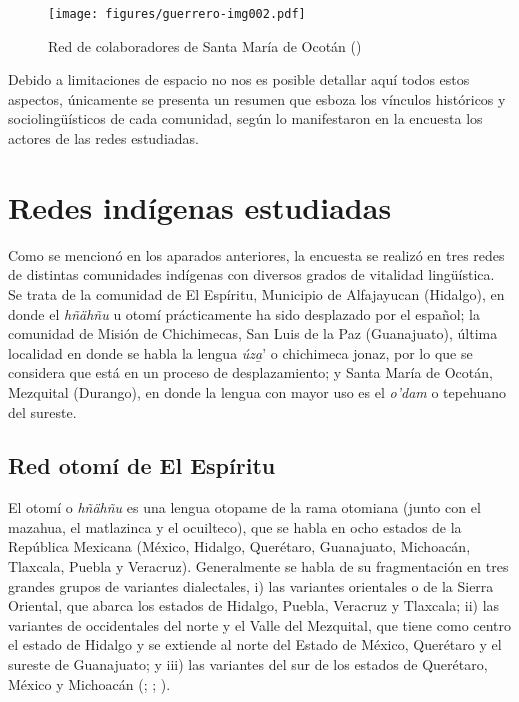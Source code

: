 \documentclass[output=paper]{../langscibook}
\begin{document}
\begin{figure}
\caption{\label{fig:guerrero:2} Red de colaboradores de Santa María de Ocotán (\citealt{TorresSánchez2018})}
\texttt{[image: figures/guerrero-img002.pdf]}
\end{figure}

Debido a limitaciones de espacio no nos es posible detallar aquí todos estos aspectos, únicamente se presenta un resumen que esboza los vínculos históricos y sociolingüísticos de cada comunidad, según lo manifestaron en la encuesta los actores de las redes estudiadas.


 \section{Redes indígenas estudiadas}


Como se mencionó en los aparados anteriores, la encuesta se realizó en tres redes de distintas comunidades indígenas con diversos grados de vitalidad lingüística. Se trata de la comunidad de El Espíritu, Municipio de Alfajayucan (Hidalgo), en donde el \textit{hñähñu} u otomí prácticamente ha sido desplazado por el español; la comunidad de Misión de Chichimecas, San Luis de la Paz (Guanajuato), última localidad en donde se habla la lengua \textit{úza̱}’ o chichimeca jonaz, por lo que se considera que está en un proceso de desplazamiento; y Santa María de Ocotán, Mezquital (Durango), en donde la lengua con mayor uso es el \textit{o’dam} o tepehuano del sureste.



 \subsection{Red otomí de El Espíritu}



El otomí o \textit{hñähñu} es una lengua otopame de la rama otomiana (junto con el mazahua, el matlazinca y el ocuilteco), que se habla en ocho estados de la República Mexicana (México, Hidalgo, Querétaro, Guanajuato, Michoacán, Tlaxcala, Puebla y Veracruz). Generalmente se habla de su fragmentación en tres grandes grupos de variantes dialectales,
i) las variantes orientales o de la Sierra Oriental, que abarca los estados de Hidalgo, Puebla, Veracruz y Tlaxcala;
ii) las variantes de occidentales del norte y el Valle del Mezquital, que tiene como centro el estado de Hidalgo y se extiende al norte del Estado de México, Querétaro y el sureste de Guanajuato; y
iii) las variantes del sur de los estados de Querétaro, México y Michoacán (\citealt{Soustelle1990}; \citealt{Lastra2006};  \citealt{GuerreroGalván2013}).
\end{document}
